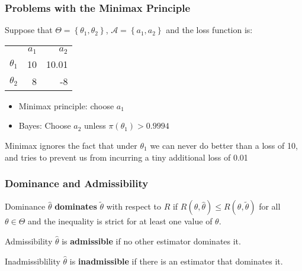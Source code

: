 \begin{frame}
  \frametitle{Problems with the Minimax Principle}
  \small

  Suppose that $\Theta = \left\{ \theta_1, \theta_2 \right\}$, $\mathcal{A} = \left\{ a_1, a_2 \right\}$ and the loss function is:
  \begin{table}
    \centering
    \begin{tabular}{lrr}
      & $a_1$ & $a_2$ \\
      \cline{2-3}
      $\theta_1$ & \multicolumn{1}{|r|}{10} & \multicolumn{1}{r|}{10.01} \\
      \cline{2-3}
      $\theta_2$ & \multicolumn{1}{|r|}{8} & \multicolumn{1}{r|}{-8}\\
      \cline{2-3}
    \end{tabular}
  \end{table}
  
  \vspace{1em}

  \begin{itemize}
    \item Minimax principle: choose $a_1$
    \item Bayes: Choose $a_2$ unless $\pi(\theta_1) > 0.9994$
  \end{itemize}


  \vspace{1em}

  \alert{Minimax ignores the fact that under $\theta_1$ we can never do better than a loss of 10, and tries to prevent us from incurring a tiny additional loss of 0.01}

\end{frame}
%
\begin{frame}
  \frametitle{Dominance and Admissibility}

  \begin{block}{Dominance}
$\widehat{\theta}$ \textbf{dominates} $\widetilde{\theta}$ with respect to $R$ if $R(\theta,\widehat{\theta}) \leq R(\theta,\widetilde{\theta})$ for all $\theta \in \Theta$ and the inequality is strict for at least one value of  $\theta$. 
  \end{block}

  \begin{block}{Admissibility}
$\widehat{\theta}$ is \textbf{admissible} if no other estimator dominates it.
  \end{block}

  \begin{alertblock}{Inadmissiblility}
    $\widehat{\theta}$ is \textbf{inadmissible} if there is an estimator that dominates it. 
  \end{alertblock}

\end{frame}
